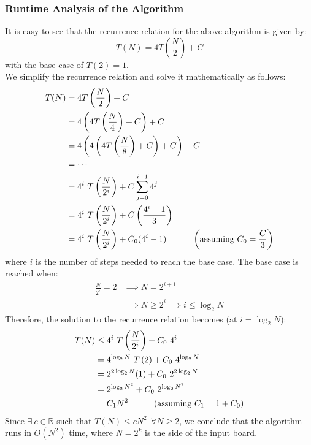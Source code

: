 \documentclass[12pt]{report}
\begin{document}
    \pagebreak

    \subsubsection*{Runtime Analysis of the Algorithm}
    It is easy to see that the recurrence relation for the above algorithm is given by:
    \begin{equation}
        T(N) = 4 T \left( \frac{N}{2} \right) + C
    \end{equation}
    with the base case of $T(2) = 1$. \\
    We simplify the recurrence relation and solve it mathematically as follows:
    \begin{align}
        T(N) &= 4 T \left( \frac{N}{2} \right) + C \nonumber \\
        &= 4 \left( 4 T \left( \frac{N}{4} \right) + C \right) + C \nonumber \\
        &= 4 \left( 4 \left( 4 T \left( \frac{N}{8} \right) + C \right) + C \right) + C \nonumber \\
        &= \cdots \nonumber \\
        &= 4^{i} \ T \left( \frac{N}{2^{i}} \right) + C \sum_{j=0}^{i-1} 4^{j} \\
        &= 4^{i} \ T \left( \frac{N}{2^{i}} \right) + C \left( \frac{4^{i} - 1}{3} \right) \nonumber \\
        &= 4^{i} \ T \left( \frac{N}{2^{i}} \right) + C_{0} ({4^{i} - 1}) \hspace*{30pt} \left(\text{assuming } C_{0} = \frac{C}{3} \right)
    \end{align}
    where $i$ is the number of steps needed to reach the base case. The base case is reached when:
    \begin{align}
        \frac{N}{2^{i}} = 2 &\implies N = 2^{i + 1} \nonumber \\
        &\implies N \ge 2^{i} \implies i \le \log_{2}{N}
    \end{align}
    Therefore, the solution to the recurrence relation becomes (at $i = \log_{2}{N}$):
    \begin{align}
        T(N) &\le 4^{i} \ T \left( \frac{N}{2^{i}} \right) + C_{0} \ 4^{i} \nonumber \\
        &= 4^{\log_{2}{N}} \ T \left( 2 \right) + C_{0} \ 4^{\log_{2}{N}} \nonumber \\
        &= 2^{2\log_{2}{N}} (1) + C_{0} \ 2^{2\log_{2}{N}} \nonumber \\
        &= 2^{\log_{2}{N^{2}}} + C_{0} \ 2^{\log_{2}{N^{2}}} \nonumber \\
        &= C_{1} N^{2} \hspace*{30pt} \hfill (\text{assuming } C_{1} = 1 + C_{0})
    \end{align}
    Since $\exists \ c \in \mathbb{R}$ such that $T(N) \le c N^{2} \ \ \forall N \ge 2$, we conclude that the algorithm runs in $O(N^{2})$ time,
    where $N = 2^{k}$ is the side of the input board.
\end{document}
